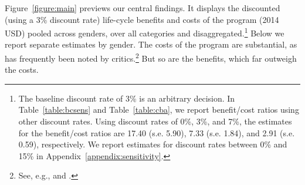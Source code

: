 Figure~\ref{figure:main} previews our central findings. It displays the discounted (using a 3\% discount rate) life-cycle benefits and costs of the program (2014 USD) pooled across genders, over all categories and disaggregated.\footnote{The baseline discount rate of 3\% is an arbitrary decision. In Table~\ref{table:bcsens} and Table~\ref{table:cba}, we report benefit/cost ratios using other discount rates. Using discount rates of 0\%, 3\%, and 7\%, the estimates for the benefit/cost ratios are 17.40 (s.e. 5.90), 7.33 (s.e. 1.84), and 2.91 (s.e. 0.59), respectively. We report estimates for discount rates between 0\% and 15\% in  Appendix~\ref{appendix:sensitivity}.} Below we report separate estimates by gender. The costs of the program are substantial, as has frequently been noted by critics.\footnote{See, e.g., \citet{Fox_News_2014_Head_Start_Effects} and \citet{Whitehurst_2014_Senate_Testimony}.} But so are the benefits, which far outweigh the costs.

